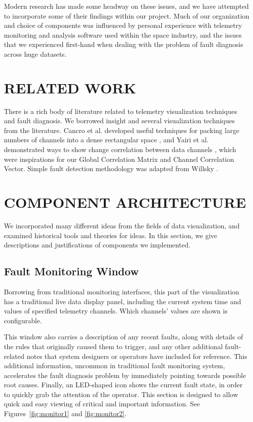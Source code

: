\documentclass[letterpaper, 10 pt, conference]{ieeeconf}  %
\begin{document}
Modern research has made some headway on these issues, and we have attempted to incorporate some of their findings within our project. Much of our organization and choice of components was influenced by personal experience with telemetry monitoring and analysis software used within the space industry, and the issues that we experienced first-hand when dealing with the problem of fault diagnosis across huge datasets.

\section{RELATED WORK}

There is a rich body of literature related to telemetry visualization techniques and fault diagnosis. We borrowed insight and several visualization techniques from the literature. Cancro et al. developed useful techniques for packing large numbers of channels into a dense rectangular space \cite{Cancro}, and Yairi et al. demonstrated ways to show change correlation between data channels \cite{Yairi}, which were inspirations for our Global Correlation Matrix and Channel Correlation Vector. Simple fault detection methodology was adapted from Willsky \cite{Willsky}.

\section{COMPONENT ARCHITECTURE}

We incorporated many different ideas from the fields of data visualization, and examined historical tools and theories for ideas. In this section, we give descriptions and justifications of components we implemented.

\subsection{Fault Monitoring Window}

Borrowing from traditional monitoring interfaces, this part of the visualization has a traditional live data display panel, including the current system time and values of specified telemetry channels. Which channels' values are shown is configurable.

This window also carries a description of any recent faults, along with details of the rules that originally caused them to trigger, and any other additional fault-related notes that system designers or operators have included for reference. This additional information, uncommon in traditional fault monitoring system, accelerates the fault diagnosis problem by immediately pointing towards possible root causes. Finally, an LED-shaped icon shows the current fault state, in order to quickly grab the attention of the operator. This section is designed to allow quick and easy viewing of critical and important information. See Figures~\ref{fig:monitor1} and \ref{fig:monitor2}.
\end{document}

